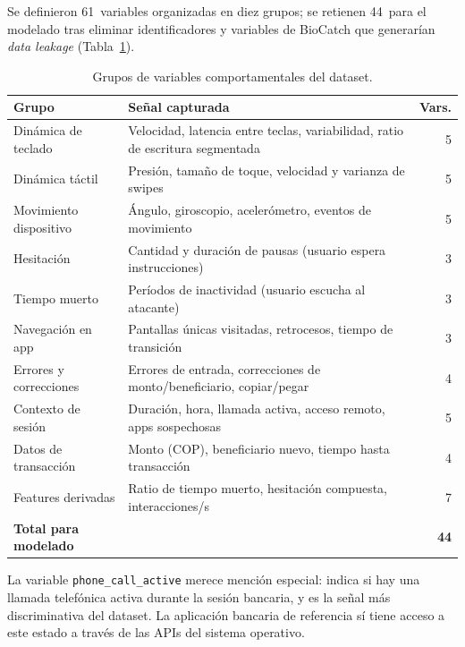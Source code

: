 \documentclass[journal]{IEEEtran}
\begin{document}
Se definieron 61~variables organizadas en diez grupos; se retienen 44~para
el modelado tras eliminar identificadores y variables de BioCatch que
generarían \textit{data leakage} (Tabla~\ref{tab:variables}).

\begin{table}[h]
\caption{Grupos de variables comportamentales del dataset.}
\label{tab:variables}
\centering
\begin{tabularx}{\columnwidth}{lXr}
\toprule
\textbf{Grupo} & \textbf{Señal capturada} & \textbf{Vars.} \\
\midrule
Dinámica de teclado   & Velocidad, latencia entre teclas, variabilidad, ratio de escritura segmentada & 5 \\
Dinámica táctil       & Presión, tamaño de toque, velocidad y varianza de swipes & 5 \\
Movimiento dispositivo& Ángulo, giroscopio, acelerómetro, eventos de movimiento & 5 \\
Hesitación            & Cantidad y duración de pausas (usuario espera instrucciones) & 3 \\
Tiempo muerto         & Períodos de inactividad (usuario escucha al atacante) & 3 \\
Navegación en app     & Pantallas únicas visitadas, retrocesos, tiempo de transición & 3 \\
Errores y correcciones& Errores de entrada, correcciones de monto/beneficiario, copiar/pegar & 4 \\
Contexto de sesión    & Duración, hora, llamada activa, acceso remoto, apps sospechosas & 5 \\
Datos de transacción  & Monto (COP), beneficiario nuevo, tiempo hasta transacción & 4 \\
Features derivadas    & Ratio de tiempo muerto, hesitación compuesta, interacciones/s & 7 \\
\midrule
\textbf{Total para modelado} & \multicolumn{1}{r}{} & \textbf{44} \\
\bottomrule
\end{tabularx}
\end{table}

La variable \texttt{phone\_call\_active} merece mención especial: indica si
hay una llamada telefónica activa durante la sesión bancaria, y es la señal
más discriminativa del dataset. La aplicación bancaria de referencia sí tiene
acceso a este estado a través de las APIs del sistema operativo.

\end{document}

